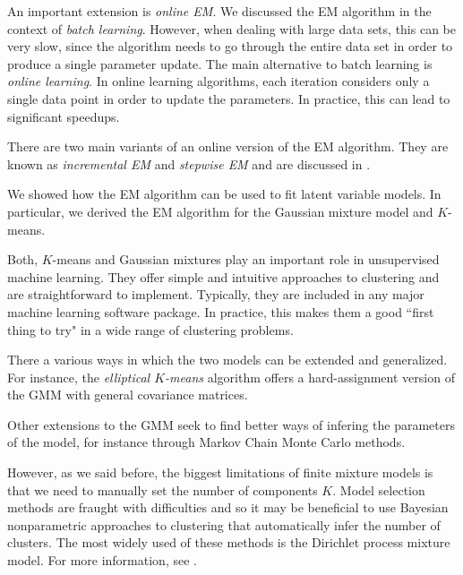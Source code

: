 \documentclass[final,3p,times,twocolumn]{elsarticle}
\begin{document}
An important extension is \emph{online EM}.
We discussed the EM algorithm in the context of \emph{batch learning}. 
However, when dealing with large data sets, this can be very slow, since the algorithm needs to go through the entire data set in order to produce a single parameter update.
The main alternative to batch learning is \emph{online learning}. 
In online learning algorithms, each iteration considers only a single data point in order to update the parameters.
In practice, this can lead to significant speedups.

There are two main variants of an online version of the EM algorithm.
They are known as \emph{incremental EM} and \emph{stepwise EM} and are discussed in \cite{liang2009}.

We showed how the EM algorithm can be used to fit latent variable models.
In particular, we derived the EM algorithm for the Gaussian mixture model and $K$-means.

Both, $K$-means and Gaussian mixtures play an important role in unsupervised machine learning.
They offer simple and intuitive approaches to clustering and are straightforward to implement.
Typically, they are included in any major machine learning software package.
In practice, this makes them a good ``first thing to try" in a wide range of clustering problems.

There a various ways in which the two models can be extended and generalized.
For instance, the \emph{elliptical $K$-means} algorithm \cite{sung1998} offers a hard-assignment version of the GMM with general covariance matrices.

Other extensions to the GMM seek to find better ways of infering the parameters of the model, for instance through Markov Chain Monte Carlo methods.

However, as we said before, the biggest limitations of finite mixture models is that we need to manually set the number of components $K$.
Model selection methods are fraught with difficulties and so it may be beneficial to use Bayesian nonparametric approaches to clustering that automatically infer the number of clusters.
The most widely used of these methods is the Dirichlet process mixture model. 
For more information, see \cite{Murphy, Teh2010a}.

\appendix


\end{document}
